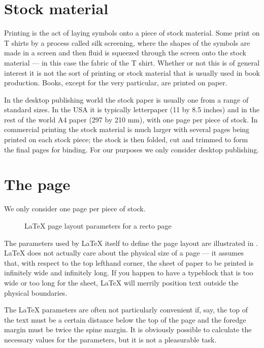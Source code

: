 \documentclass[10pt,letterpaper]{memoir}
\newcommand{\foredge}{foredge}
\begin{document}
\section{Stock material}

   Printing is the act of laying symbols onto a piece of stock material.
Some print on T shirts by a process called silk screening, where the shapes of
the symbols are made in a screen and then fluid is squeezed through the screen
onto the stock material --- in this case the fabric of the T shirt. Whether or
not this is of general interest it is not the sort of printing or stock
material that is usually used in book production. Books, except for the very
particular, are printed on paper. 

    In the desktop publishing world the stock
paper is usually one from a range of standard sizes. In the USA it is typically
letterpaper (11 by 8.5 inches) and in the rest of the world A4 paper 
(297 by 210 mm), with one page per piece of stock. In commercial 
printing the stock material is much larger with several pages being 
printed on each stock piece; the stock is then folded, cut and trimmed to form
the final pages for binding. For our purposes we only consider desktop
publishing.


\section{The page}
 
    We only consider one page per piece of stock. 


\begin{figure}
\centering
\drawpage
\caption{LaTeX page layout parameters for a recto page} \label{fig:anoddpage}
\end{figure}


    The parameters used by LaTeX itself to define the page layout are 
illustrated in . LaTeX does not actually care about the
physical size of a page --- it assumes that, with respect to the top lefthand
corner, the sheet of paper to be printed is infinitely wide and infinitely
long. If you happen to have a typeblock that is too wide or too long for
the sheet, LaTeX will merrily position text outside the physical boundaries.

    The LaTeX parameters are often not particularly convenient if, say, the top
of the text must be a certain distance below the top of the page and the 
\foredge{} margin must be twice the spine margin. It is obviously possible
to calculate the necessary values for the parameters, but it is
not a pleasurable task.
\end{document}
